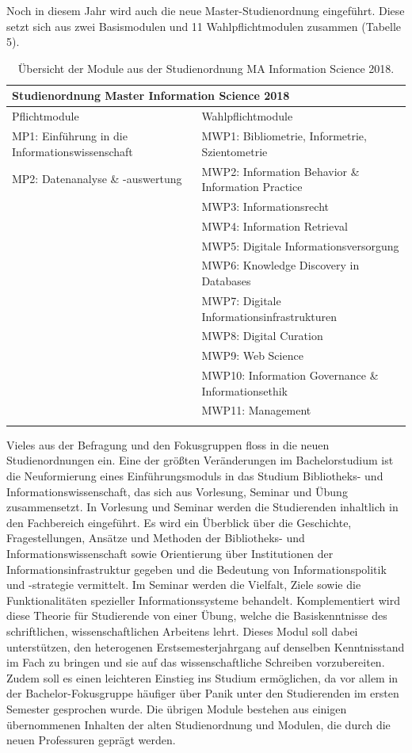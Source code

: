 \documentclass[a4paper,
fontsize=11pt,
oneside,
numbers=noperiodatend,
parskip=half-,
bibliography=totoc,
final
]{scrartcl}
\begin{document}
Noch in diesem Jahr wird auch die neue Master-Studienordnung eingeführt.
Diese setzt sich aus zwei Basismodulen und 11 Wahlpflichtmodulen
zusammen (Tabelle 5).

\pagebreak

\begin{longtable}[]{@{}p{8cm}p{8cm}@{}}
\toprule
\multicolumn{2}{l}{\textbf{Studienordnung Master Information Science 2018}} \tabularnewline
\midrule
\endhead
Pflichtmodule & Wahlpflichtmodule\tabularnewline
\midrule
MP1: Einführung in die Informationswissenschaft & MWP1: Bibliometrie,
Informetrie, Szientometrie\tabularnewline
MP2: Datenanalyse \& -auswertung & MWP2: Information Behavior \&
Information Practice\tabularnewline
& MWP3: Informationsrecht\tabularnewline
& MWP4: Information Retrieval\tabularnewline
& MWP5: Digitale Informationsversorgung\tabularnewline
& MWP6: Knowledge Discovery in Databases\tabularnewline
& MWP7: Digitale Informationsinfrastrukturen\tabularnewline
& MWP8: Digital Curation\tabularnewline
& MWP9: Web Science\tabularnewline
& MWP10: Information Governance \& Informationsethik\tabularnewline
& MWP11: Management\tabularnewline
\bottomrule
\caption{Übersicht der Module aus der Studienordnung MA Information
Science 2018.}
\end{longtable}

Vieles aus der Befragung und den Fokusgruppen floss in die neuen
Studienordnungen ein. Eine der größten Veränderungen im Bachelorstudium
ist die Neuformierung eines Einführungsmoduls in das Studium
Bibliotheks- und Informationswissenschaft, das sich aus Vorlesung,
Seminar und Übung zusammensetzt. In Vorlesung und Seminar werden die
Studierenden inhaltlich in den Fachbereich eingeführt. Es wird ein
Überblick über die Geschichte, Fragestellungen, Ansätze und Methoden der
Bibliotheks- und Informationswissenschaft sowie Orientierung über
Institutionen der Informationsinfrastruktur gegeben und die Bedeutung
von Informationspolitik und -strategie vermittelt. Im Seminar werden die
Vielfalt, Ziele sowie die Funktionalitäten spezieller
Informationssysteme behandelt. Komplementiert wird diese Theorie für
Studierende von einer Übung, welche die Basiskenntnisse des
schriftlichen, wissenschaftlichen Arbeitens lehrt. Dieses Modul soll
dabei unterstützen, den heterogenen Erstsemesterjahrgang auf denselben
Kenntnisstand im Fach zu bringen und sie auf das wissenschaftliche
Schreiben vorzubereiten. Zudem soll es einen leichteren Einstieg ins
Studium ermöglichen, da vor allem in der Bachelor-Fokusgruppe häufiger
über Panik unter den Studierenden im ersten Semester gesprochen wurde.
Die übrigen Module bestehen aus einigen übernommenen Inhalten der alten
Studienordnung und Modulen, die durch die neuen Professuren geprägt
werden.
\end{document}

